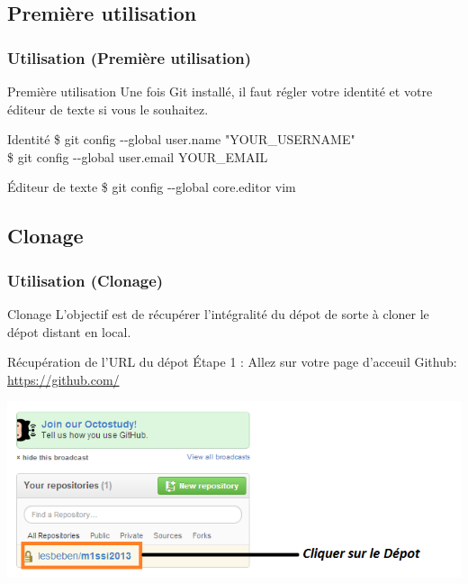 \documentclass{beamer}
\begin{document}

\subsection{Premi\`{e}re utilisation}
\begin{frame}
\frametitle{Utilisation (Premi\`{e}re utilisation)}
\begin{block}{Premi\`{e}re utilisation}
Une fois Git install\'{e}, il faut r\'{e}gler votre identit\'{e} et votre \'{e}diteur de texte si vous le souhaitez.
\end{block}

\begin{block}{Identit\'{e}}
\$ git config \--\--global user.name "YOUR\_USERNAME"\\
\$ git config \--\--global user.email YOUR\_EMAIL
\end{block}

\begin{block}{\'{E}diteur de texte}
\$ git config \--\--global core.editor vim
\end{block}
\end{frame}

\subsection{Clonage}
\begin{frame}
\frametitle{Utilisation (Clonage)}
\begin{block}{Clonage}
L'objectif est de r\'{e}cup\'{e}rer l'int\'{e}gralit\'{e} du d\'{e}pot de sorte \`{a} cloner le d\'{e}pot distant en local.
\end{block}

\begin{block}{R\'{e}cup\'{e}ration de l'URL du d\'{e}pot}
\'{E}tape 1 : Allez sur votre page d'acceuil Github:  \href{https://github.com/}{https://github.com/}
\end{block}
\includegraphics[scale=0.6]{githubhomedepot.png}
\end{frame}
\end{document}
